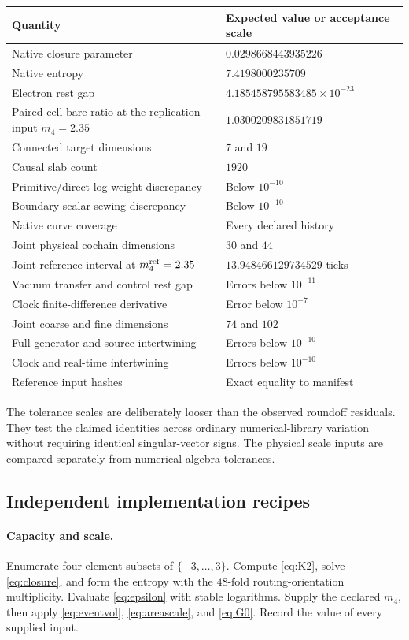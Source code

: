 \begin{longtable}{L{0.46\textwidth}L{0.46\textwidth}}
\toprule Quantity & Expected value or acceptance scale\\\midrule\endhead
Native closure parameter & $0.0298668443935226$\\
Native entropy & $7.4198000235709$\\
Electron rest gap & $4.185458795583485\times10^{-23}$\\
Paired-cell bare ratio at the replication input $m_4=2.35$ & $1.0300209831851719$\\
Connected target dimensions & $7$ and $19$\\
Causal slab count & $1920$\\
Primitive/direct log-weight discrepancy & Below $10^{-10}$\\
Boundary scalar sewing discrepancy & Below $10^{-10}$\\
Native curve coverage & Every declared history\\
Joint physical cochain dimensions & $30$ and $44$\\
Joint reference interval at $m_4^{\rm ref}=2.35$ & $13.948466129734529$ ticks\\
Vacuum transfer and control rest gap & Errors below $10^{-11}$\\
Clock finite-difference derivative & Error below $10^{-7}$\\
Joint coarse and fine dimensions & $74$ and $102$\\
Full generator and source intertwining & Errors below $10^{-10}$\\
Clock and real-time intertwining & Errors below $10^{-10}$\\
Reference input hashes & Exact equality to manifest\\
\bottomrule
\end{longtable}

The tolerance scales are deliberately looser than the observed roundoff residuals. They test the claimed identities across ordinary numerical-library variation without requiring identical singular-vector signs. The physical scale inputs are compared separately from numerical algebra tolerances.

\subsection{Independent implementation recipes}

\paragraph{Capacity and scale.}
Enumerate four-element subsets of $\{-3,\ldots,3\}$. Compute \eqref{eq:K2}, solve \eqref{eq:closure}, and form the entropy with the $48$-fold routing-orientation multiplicity. Evaluate \eqref{eq:epsilon} with stable logarithms. Supply the declared $m_4$, then apply \eqref{eq:eventvol}, \eqref{eq:areascale}, and \eqref{eq:G0}. Record the value of every supplied input.

